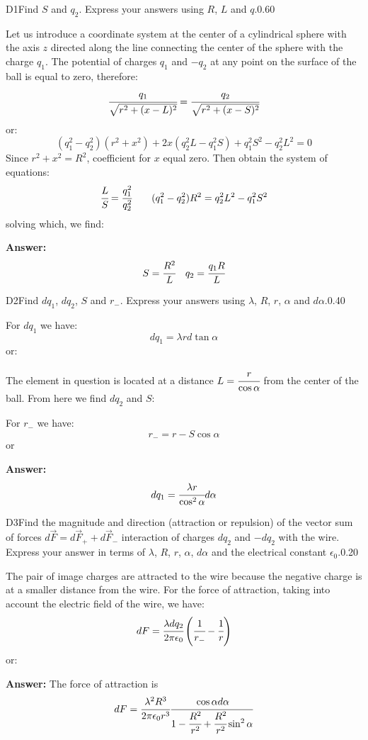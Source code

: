 \documentclass[11pt,a4paper]{article}
\begin{document}
\begin{solcard}{D1}{Find $S$ and $q_2$. Express your answers using $R$, $L$ and $q$.}{0.60}

Let us introduce a coordinate system at the center of a cylindrical sphere with the axis $z$ directed along the line connecting the center of the sphere with the charge $q_1$. The potential of charges $q_1$ and $-q_2$ at any point on the surface of the ball is equal to zero, therefore: $$\cfrac{q_1}{\sqrt{r^2+(x-L)^2}}=\cfrac{q_2}{\sqrt{r^2+(x-S)^2}} $$ or: $$(q^2_1-q^2_2)(r^2+x^2)+2x(q^2_2L-q^2_1S)+q^2_1S^2-q^2_2L^2=0 $$ Since $r^2+x^2=R^2$, coefficient for $x$ equal zero. Then obtain the system of equations: $$\cfrac{L}{S}=\cfrac{q^2_1}{q^2_2}\qquad (q^2_1-q^2_2)R^2=q^2_2L^2-q^2_1S^2 $$ solving which, we find:

\par\smallskip\noindent\textbf{Answer:} $$S=\cfrac{R^2}{L}\quad q_2=\cfrac{q_1R}{L} $$
\end{solcard}

\begin{solcard}{D2}{Find $dq_1$, $dq_2$, $S$ and $r_{-}$. Express your answers using $\lambda$, $R$, $r$, $\alpha$ and $d\alpha$.}{0.40}

For $dq_1$ we have: $$dq_1=\lambda rd\tan{\alpha} $$ or:


The element in question is located at a distance $L=\cfrac{r}{\cos\alpha}$ from the center of the ball. From here we find $dq_2$ and $S$:


For $r_{-}$ we have: $$r_{-}=r-S\cos\alpha $$ or

\par\smallskip\noindent\textbf{Answer:} $$dq_1=\cfrac{\lambda r}{\cos^2\alpha}d\alpha $$
\end{solcard}

\begin{solcard}{D3}{Find the magnitude and direction (attraction or repulsion) of the vector sum of forces $d\vec{F}=d\vec{F}_++d\vec{F}_-$ interaction of charges $dq_2$ and $-dq_2$ with the wire.  Express your answer in terms of $\lambda$, $R$, $r$, $\alpha$, $d\alpha$ and the electrical constant $\epsilon_0$.}{0.20}

The pair of image charges are attracted to the wire because the negative charge is at a smaller distance from the wire. For the force of attraction, taking into account the electric field of the wire, we have: $$dF=\cfrac{\lambda dq_2}{2\pi\epsilon_0}\left(\cfrac{1}{r_{-}}-\cfrac{1}{r}\right) $$ or:

\par\smallskip\noindent\textbf{Answer:} The force of attraction is $$dF=\cfrac{\lambda^2R^3}{2\pi\epsilon_0r^3}\cfrac{\cos\alpha d\alpha}{1-\cfrac{R^2}{r^2}+\cfrac{R^2}{r^2}\sin^2\alpha} $$
\end{solcard}
\end{document}
